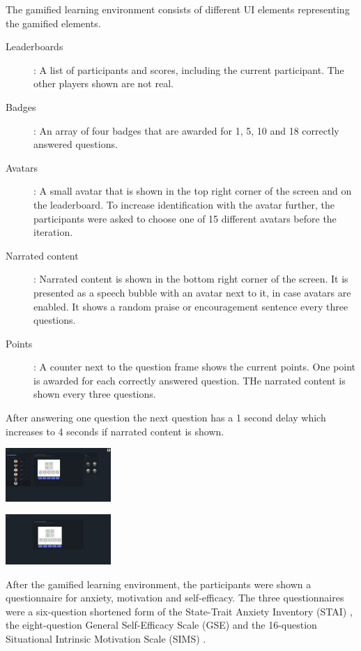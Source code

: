 The gamified learning environment consists of different UI elements representing the gamified elements.
\begin{description}
  \item[Leaderboards]: A list of participants and scores, including the current participant. The other players shown are not real.
  \item[Badges]: An array of four badges that are awarded for 1, 5, 10 and 18 correctly answered questions.
  \item[Avatars]: A small avatar that is shown in the top right corner of the screen and on the leaderboard. To increase identification with the avatar further, the participants were asked to choose one of 15 different avatars before the iteration.
  \item[Narrated content]: Narrated content is shown in the bottom right corner of the screen. It is presented as a speech bubble with an avatar next to it, in case avatars are enabled. It shows a random praise or encouragement sentence every three questions.
  \item[Points]: A counter next to the question frame shows the current points. One point is awarded for each correctly answered question. THe narrated content is shown every three questions.
\end{description}
After answering one question the next question has a 1 second delay which increases to 4 seconds if narrated content is shown.
\begin{minipage}{\textwidth}
  \includegraphics[width=0.3\textwidth]{img/question_screen.png}
  \label{fig:figureScreen}
\end{minipage}
\begin{minipage}{\textwidth}
  \includegraphics[width=0.3\textwidth]{img/question_screen_no_elements.png}
  \label{fig:figureScreen}
\end{minipage}
After the gamified learning environment, the participants were shown a questionnaire for anxiety, motivation and self-efficacy. The three questionnaires were a six-question shortened form of the State-Trait Anxiety Inventory (STAI) \parencite{marteauDevelopmentSixitemShortform1992}, the eight-question General Self-Efficacy Scale (GSE) \parencite{guayAssessmentSituationalIntrinsic2000} and the 16-question Situational Intrinsic Motivation Scale (SIMS) \parencite{chenValidationNewGeneral2001}.




